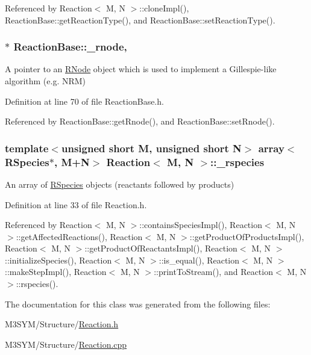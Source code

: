 Referenced by Reaction$<$ M, N $>$\+::clone\+Impl(), Reaction\+Base\+::get\+Reaction\+Type(), and Reaction\+Base\+::set\+Reaction\+Type().

\hypertarget{classReactionBase_aa402747434b46dbea69b94928140b3a2}{
\subsubsection[{\+\_\+rnode}]{$\ast$ Reaction\+Base\+::\+\_\+rnode\hspace{0.3cm}{\ttfamily [protected]}, {\ttfamily [inherited]}}}\label{classReactionBase_aa402747434b46dbea69b94928140b3a2}


A pointer to an \hyperlink{classRNode}{R\+Node} object which is used to implement a Gillespie-\/like algorithm (e.\+g. N\+R\+M) 



Definition at line 70 of file Reaction\+Base.\+h.



Referenced by Reaction\+Base\+::get\+Rnode(), and Reaction\+Base\+::set\+Rnode().

\hypertarget{classReaction_a7d4b32fa500aefd7aef6910eef61290f}{
\subsubsection[{\+\_\+rspecies}]{\setlength{\rightskip}{0pt plus 5cm}template$<$unsigned short M, unsigned short N$>$ array$<${\bf R\+Species}$\ast$, M+N$>$ {\bf Reaction}$<$ M, N $>$\+::\+\_\+rspecies\hspace{0.3cm}{\ttfamily [private]}}}\label{classReaction_a7d4b32fa500aefd7aef6910eef61290f}


An array of \hyperlink{classRSpecies}{R\+Species} objects (reactants followed by products) 



Definition at line 33 of file Reaction.\+h.



Referenced by Reaction$<$ M, N $>$\+::contains\+Species\+Impl(), Reaction$<$ M, N $>$\+::get\+Affected\+Reactions(), Reaction$<$ M, N $>$\+::get\+Product\+Of\+Products\+Impl(), Reaction$<$ M, N $>$\+::get\+Product\+Of\+Reactants\+Impl(), Reaction$<$ M, N $>$\+::initialize\+Species(), Reaction$<$ M, N $>$\+::is\+\_\+equal(), Reaction$<$ M, N $>$\+::make\+Step\+Impl(), Reaction$<$ M, N $>$\+::print\+To\+Stream(), and Reaction$<$ M, N $>$\+::rspecies().



The documentation for this class was generated from the following files\+:\begin{DoxyCompactItemize}
\item 
M3\+S\+Y\+M/\+Structure/\hyperlink{Reaction_8h}{Reaction.\+h}\item 
M3\+S\+Y\+M/\+Structure/\hyperlink{Reaction_8cpp}{Reaction.\+cpp}\end{DoxyCompactItemize}
